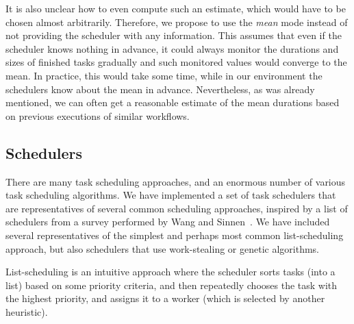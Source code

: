 \begin{description}[wide=0pt]
		It is also unclear how to even compute such an estimate, which would have to be chosen almost
		arbitrarily. Therefore, we propose to use the \emph{mean} mode instead of not providing
		the scheduler with any information. This assumes that even if the scheduler knows nothing in
		advance, it could always monitor the durations and sizes of finished tasks gradually and such
		monitored values would converge to the mean. In practice, this would take some time, while in our
		environment the schedulers know about the mean in advance. Nevertheless, as was already mentioned,
		we can often get a reasonable estimate of the mean durations based on previous executions of
		similar workflows.
\end{description}

%

\subsection{Schedulers}
\label{subsec:estee-schedulers}
There are many task scheduling approaches, and an enormous number of various task scheduling
algorithms. We have implemented a set of task schedulers that are representatives of several common
scheduling approaches, inspired by a list of schedulers from a survey performed by Wang and
Sinnen~\cite{wang2018list}. We have included several representatives of the simplest and
perhaps most common list-scheduling approach, but also schedulers that use work-stealing or genetic
algorithms.

List-scheduling is an intuitive approach where the scheduler sorts tasks (into a list) based on
some priority criteria, and then repeatedly chooses the task with the highest priority, and assigns
it to a worker (which is selected by another heuristic).

